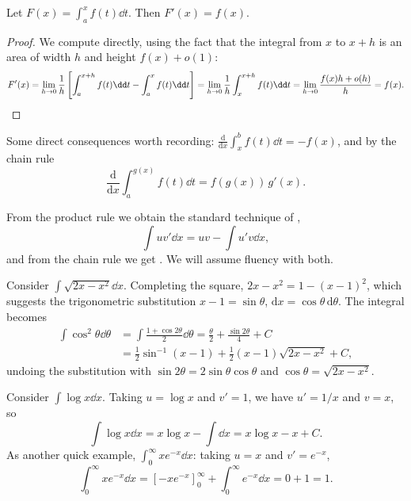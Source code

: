 \begin{theorem}
	Let $F(x) = \int_a^x f(t) \dd t$. Then $F'(x) = f(x)$.
\end{theorem}
\begin{proof}
	We compute directly, using the fact that the integral from $x$ to $x + h$ is an area of width $h$ and height $f(x) + o(1)$:
	$$
	F'(x) = \lim_{h \to 0} \frac{1}{h}\left[\int_a^{x + h} f(t) \dd t - \int_a^x f(t) \dd t \right] = \lim_{h \to 0} \frac{1}{h} \int_x^{x + h} f(t) \dd t = \lim_{h \to 0} \frac{f(x) h + o(h)}{h} = f(x). \qedhere
	$$
\end{proof}

Some direct consequences worth recording: $\frac{\mathrm{d}}{\mathrm{d}x}\int_x^b f(t) \dd t = -f(x)$, and by the chain rule
$$
\frac{\mathrm{d}}{\mathrm{d}x} \int_a^{g(x)} f(t) \dd t = f(g(x))\, g'(x).
$$

From the product rule we obtain the standard technique of ,
$$
\int u v' \dd x = uv - \int u' v \dd x,
$$
and from the chain rule we get . We will assume fluency with both.

\begin{example}
	Consider $\int \sqrt{2x - x^2} \dd x$. Completing the square, $2x - x^2 = 1 - (x - 1)^2$, which suggests the trigonometric substitution $x - 1 = \sin\theta$, $\mathrm{d}x = \cos \theta \, \mathrm{d}\theta$. The integral becomes
	\begin{align*}
		\int \cos^2 \theta \dd \theta &= \int \frac{1 + \cos 2\theta}{2} \dd\theta = \frac{\theta}{2} + \frac{\sin 2\theta}{4} + C \\
		&= \frac{1}{2}\sin^{-1}(x - 1) + \frac{1}{2}(x - 1)\sqrt{2x - x^2} + C,
	\end{align*}
	undoing the substitution with $\sin 2\theta = 2 \sin\theta\cos\theta$ and $\cos \theta = \sqrt{2x - x^2}$.
\end{example}

\begin{example}
	Consider $\int \log x \dd x$. Taking $u = \log x$ and $v' = 1$, we have $u' = 1/x$ and $v = x$, so
	$$
	\int \log x \dd x = x \log x - \int \dd x = x \log x - x + C.
	$$
	As another quick example, $\int_0^\infty x e^{-x} \dd x$: taking $u = x$ and $v' = e^{-x}$,
	$$
	\int_0^\infty x e^{-x} \dd x = \left[-x e^{-x}\right]_0^\infty + \int_0^\infty e^{-x} \dd x = 0 + 1 = 1.
	$$
\end{example}

